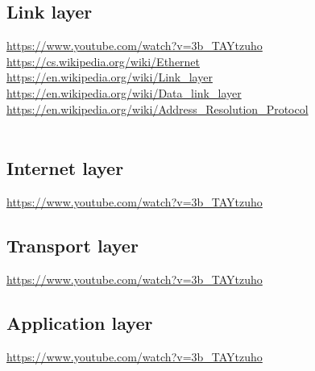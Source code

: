 \documentclass[12pt]{article}
\begin{document}
\subsection{Link layer}
\url{https://www.youtube.com/watch?v=3b_TAYtzuho}
\\
\url{https://cs.wikipedia.org/wiki/Ethernet}
\\
\url{https://en.wikipedia.org/wiki/Link_layer}
\\
\url{https://en.wikipedia.org/wiki/Data_link_layer}
\\
\url{https://en.wikipedia.org/wiki/Address_Resolution_Protocol}
\\
\url{}
\\
\url{}

\subsection{Internet layer}
\url{https://www.youtube.com/watch?v=3b_TAYtzuho}
\subsection{Transport layer}
\url{https://www.youtube.com/watch?v=3b_TAYtzuho}
\subsection{Application layer}
\url{https://www.youtube.com/watch?v=3b_TAYtzuho}
\end{document}
